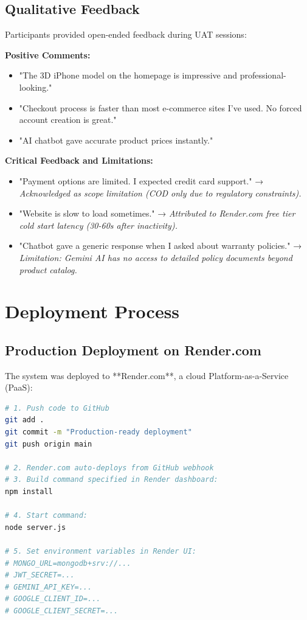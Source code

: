 \subsection{Qualitative Feedback}

Participants provided open-ended feedback during UAT sessions:

\textbf{Positive Comments:}
\begin{itemize}
    \item "The 3D iPhone model on the homepage is impressive and professional-looking."
    \item "Checkout process is faster than most e-commerce sites I've used. No forced account creation is great."
    \item "AI chatbot gave accurate product prices instantly."
\end{itemize}

\textbf{Critical Feedback and Limitations:}
\begin{itemize}
    \item "Payment options are limited. I expected credit card support." → \textit{Acknowledged as scope limitation (COD only due to regulatory constraints).}
    \item "Website is slow to load sometimes." → \textit{Attributed to Render.com free tier cold start latency (30-60s after inactivity).}
    \item "Chatbot gave a generic response when I asked about warranty policies." → \textit{Limitation: Gemini AI has no access to detailed policy documents beyond product catalog.}
\end{itemize}

\section{Deployment Process}

\subsection{Production Deployment on Render.com}

The system was deployed to **Render.com**, a cloud Platform-as-a-Service (PaaS):

\begin{lstlisting}[language=bash, caption=Deployment Steps]
# 1. Push code to GitHub
git add .
git commit -m "Production-ready deployment"
git push origin main

# 2. Render.com auto-deploys from GitHub webhook
# 3. Build command specified in Render dashboard:
npm install

# 4. Start command:
node server.js

# 5. Set environment variables in Render UI:
# MONGO_URL=mongodb+srv://...
# JWT_SECRET=...
# GEMINI_API_KEY=...
# GOOGLE_CLIENT_ID=...
# GOOGLE_CLIENT_SECRET=...
\end{lstlisting}

